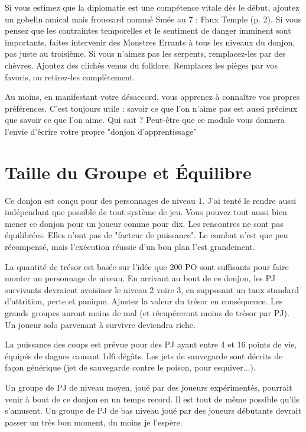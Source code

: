 Si vous estimez que la diplomatie est une compétence vitale dès le début, ajoutez un gobelin amical mais froussard nommé
Smée au 7 : Faux Temple (p. 2).
Si vous pensez que les contraintes temporelles et le sentiment de danger imminent sont importants, faites intervenir des Monstres Errants à tous les niveaux du donjon, pas juste au troisième.
Si vous n'aimez pas les serpents, remplacez-les par des chèvres.
Ajoutez des clichés venus du folklore.
Remplacez les pièges par vos favoris, ou retirez-les complètement.

Au moins, en manifestant votre désaccord, vous apprenez à connaître vos propres préférences.
C'est toujours utile : savoir ce que l'on n'aime pas est aussi précieux que savoir ce que l'on
aime.
Qui sait ? Peut-être que ce module vous donnera l'envie d'écrire votre propre "donjon d'apprentissage"

\section{Taille du Groupe et Équilibre}
Ce donjon est conçu pour des personnages de niveau 1.
J'ai tenté le rendre aussi indépendant que possible de tout système de jeu.
Vous pouvez tout aussi bien mener ce donjon pour un joueur comme pour dix.
Les rencontres ne sont pas équilibrées.
Elles n'ont pas de "facteur de puissance".
Le combat n'est que peu récompensé, mais l'exécution réussie d'un bon plan l'est grandement.

La quantité de trésor est basée sur l'idée que 200 PO sont suffisants pour faire monter un personnage de niveau.
En arrivant au bout de ce donjon, les PJ survivants devraient avoisiner le niveau 2 voire 3, en supposant un taux standard d'attrition, perte et panique.
Ajustez la valeur du trésor en conséquence.
Les grands groupes auront moins de mal (et récupéreront moins de trésor par PJ).
Un joueur solo parvenant à survivre deviendra riche.

La puissance des coups est prévue pour des PJ ayant entre 4 et 16 points de vie, équipés de dagues causant 1d6 dégâts.
Les jets de sauvegarde sont décrits de façon générique (jet de sauvegarde contre le poison, pour esquiver...).

Un groupe de PJ de niveau moyen, joué par des joueurs expérimentés, pourrait venir à bout de ce donjon en un temps
record.
Il est tout de même possible qu'ils s'amusent.
Un groupe de PJ de bas niveau joué par des joueurs débutants devrait passer un très bon moment, du moins je l'espère.

